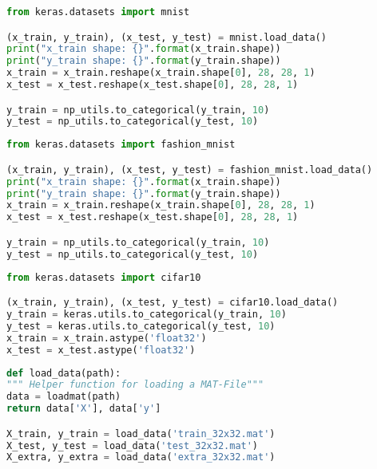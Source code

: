\begin{lstlisting}[language=Python,label={code:mnist},caption={Code for loading MNIST dataset}]
from keras.datasets import mnist

(x_train, y_train), (x_test, y_test) = mnist.load_data()
print("x_train shape: {}".format(x_train.shape))
print("y_train shape: {}".format(y_train.shape))
x_train = x_train.reshape(x_train.shape[0], 28, 28, 1)
x_test = x_test.reshape(x_test.shape[0], 28, 28, 1)

y_train = np_utils.to_categorical(y_train, 10)
y_test = np_utils.to_categorical(y_test, 10)
\end{lstlisting}

\begin{lstlisting}[language=Python,label={code:fashionmnist},caption={Code for loading Fashion MNIST dataset}]
from keras.datasets import fashion_mnist

(x_train, y_train), (x_test, y_test) = fashion_mnist.load_data()
print("x_train shape: {}".format(x_train.shape))
print("y_train shape: {}".format(y_train.shape))
x_train = x_train.reshape(x_train.shape[0], 28, 28, 1)
x_test = x_test.reshape(x_test.shape[0], 28, 28, 1)

y_train = np_utils.to_categorical(y_train, 10)
y_test = np_utils.to_categorical(y_test, 10)
\end{lstlisting}

\begin{lstlisting}[language=Python,label={code:cifar10},caption={Code for loading CIFAR-10 dataset}]
from keras.datasets import cifar10

(x_train, y_train), (x_test, y_test) = cifar10.load_data()
y_train = keras.utils.to_categorical(y_train, 10)
y_test = keras.utils.to_categorical(y_test, 10)
x_train = x_train.astype('float32')
x_test = x_test.astype('float32')
\end{lstlisting}



\begin{lstlisting}[language=Python,label={code:SVHN},caption={Code for loading SVHN dataset}]
def load_data(path):
""" Helper function for loading a MAT-File"""
data = loadmat(path)
return data['X'], data['y']

X_train, y_train = load_data('train_32x32.mat')
X_test, y_test = load_data('test_32x32.mat')
X_extra, y_extra = load_data('extra_32x32.mat')


\end{lstlisting}

